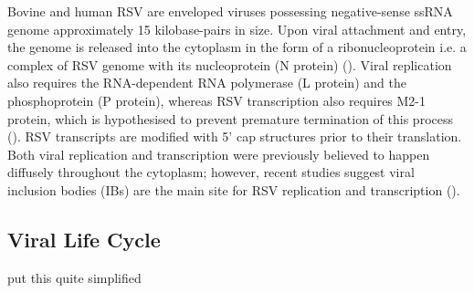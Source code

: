 Bovine and human RSV are enveloped viruses possessing negative-sense ssRNA genome approximately 15 kilobase-pairs in size. Upon viral attachment and entry, the genome is released into the cytoplasm in the form of a ribonucleoprotein i.e. a complex of RSV genome with its nucleoprotein (N protein) (\cite{Noton2015InitiationReplication}). Viral replication also requires the RNA-dependent RNA polymerase (L protein) and the phosphoprotein (P protein), whereas RSV transcription also requires M2-1 protein, which is hypothesised to prevent premature termination of this process (\cite{Tanner2014CrystalPhosphorylation}). RSV transcripts are modified with 5' cap structures prior to their translation. Both viral replication and transcription were previously believed to happen diffusely throughout the cytoplasm; however, recent studies suggest viral inclusion bodies (IBs) are the main site for RSV replication and transcription (\cite{Rincheval2017FunctionalVirus}). 

\subsection{Viral Life Cycle} \label{subsec:Viral Life Cycle}
put this quite simplified

